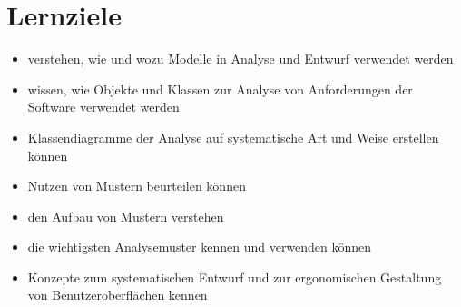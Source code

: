 \section{Lernziele}
\begin{itemize}
    \item verstehen, wie und wozu Modelle in Analyse und Entwurf verwendet werden
    \item wissen, wie Objekte und Klassen zur Analyse von Anforderungen der Software verwendet werden
    \item Klassendiagramme der Analyse auf systematische Art und Weise erstellen können
    \item Nutzen von Mustern beurteilen können
    \item den Aufbau von Mustern verstehen
    \item die wichtigsten Analysemuster kennen und verwenden können
    \item Konzepte zum systematischen Entwurf und zur ergonomischen Gestaltung von Benutzeroberflächen kennen
\end{itemize}